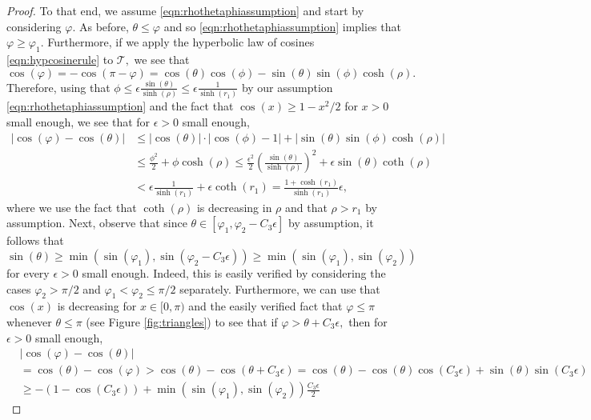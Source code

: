 \documentclass[a4paper,12pt]{article}
\newcommand{\CT}{{\mathcal{T}}}
\begin{document}
\begin{proof}
To that end, we assume \eqref{eqn:rhothetaphiassumption} and start by considering $\varphi.$ 
As before, $\theta\leq \varphi$ and so \eqref{eqn:rhothetaphiassumption} implies that 
$\varphi \geq \varphi_1.$ Furthermore, 
if we apply the hyperbolic law of cosines \eqref{eqn:hypcosinerule} to $\CT,$ we see that 
\[
\cos(\varphi) =-\cos(\pi-\varphi) 
=\cos(\theta)\cos(\phi)-\sin(\theta)\sin(\phi)\cosh(\rho).   
\]
Therefore, using that $\phi\leq \epsilon \frac{\sin(\theta)}{\sinh(\rho)}
\leq \epsilon \frac{1}{\sinh(r_1)}$ by our assumption 
\eqref{eqn:rhothetaphiassumption} and the fact that $\cos(x)\geq 1-x^2/2$ for $x>0$
small enough, we see that for $\epsilon>0$ small enough,
\begin{align} \label{eqn:cosvarphithetaineq1}
|\cos(\varphi)-\cos(\theta)|
& \leq |\cos(\theta)|\cdot |\cos(\phi)-1| +|\sin(\theta)\sin(\phi)\cosh(\rho)| \\
& \leq \frac{\phi^2}{2}+\phi\cosh(\rho)
\leq \frac{\epsilon^2}{2}\left(\frac{\sin(\theta)}{\sinh(\rho)}\right)^2
+\epsilon\sin(\theta)\coth(\rho)\\
& < \epsilon \frac{1}{\sinh(r_1)}+\epsilon\coth(r_1) 
= \frac{1+\cosh(r_1)}{\sinh(r_1)}\epsilon, \nonumber
\end{align}
where we use the fact that $\coth(\rho)$ is decreasing in $\rho$ and that 
$\rho>r_1$ by assumption.
Next, observe that since $\theta\in[\varphi_1,\varphi_2-C_3 \epsilon]$ by assumption, 
it follows that
\begin{equation} \label{eqn:minsin}
\sin(\theta) \geq \min(\sin(\varphi_1),\sin(\varphi_2-C_3 \epsilon))
\geq \min(\sin(\varphi_1),\sin(\varphi_2))    
\end{equation}
for every $\epsilon>0$ small enough. Indeed, this is easily verified by considering 
the cases $\varphi_2>\pi/2$ and $\varphi_1<\varphi_2\leq \pi/2$ separately.
Furthermore, we can use that $\cos(x)$ is decreasing for $x\in[0,\pi)$
and the easily verified fact that $\varphi\leq \pi$ whenever $\theta\leq \pi$ (see Figure 
\ref{fig:triangles}) to see that
if $\varphi>\theta+C_3\epsilon,$ then for $\epsilon>0$ small enough,
\begin{align} \label{eqn:cosvarphithetaineq1contradict}
&|\cos(\varphi)-\cos(\theta)| \\
&=\cos(\theta)-\cos(\varphi)
>\cos(\theta)-\cos(\theta+C_3\epsilon) 
=\cos(\theta)-\cos(\theta)\cos(C_3\epsilon)+\sin(\theta)\sin(C_3\epsilon) \nonumber \\
& \geq -(1-\cos(C_3\epsilon))+\min(\sin(\varphi_1),\sin(\varphi_2))\frac{C_3\epsilon}{2} 

\end{align}
\end{proof}
\end{document}
